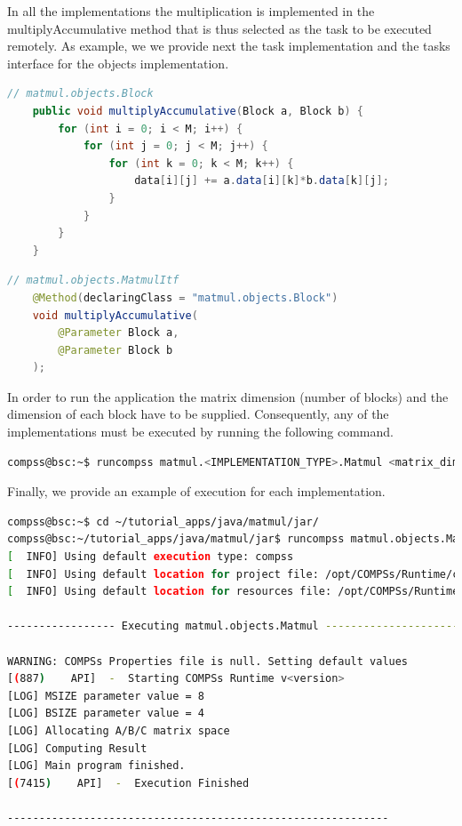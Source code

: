 \newpage 
In all the implementations the multiplication is implemented in the multiplyAccumulative method that is thus selected as the task to be executed remotely.
As example, we we provide next the task implementation and the tasks interface for the objects implementation.

\begin{lstlisting}[language=java]
	// matmul.objects.Block
	public void multiplyAccumulative(Block a, Block b) {
		for (int i = 0; i < M; i++) {
			for (int j = 0; j < M; j++) {
				for (int k = 0; k < M; k++) {
					data[i][j] += a.data[i][k]*b.data[k][j];
				}
			}
		}
	}
\end{lstlisting}

\begin{lstlisting}[language=java]
	// matmul.objects.MatmulItf
	@Method(declaringClass = "matmul.objects.Block")
	void multiplyAccumulative(
		@Parameter Block a,
		@Parameter Block b
	);
\end{lstlisting}

In order to run the application the matrix dimension (number of blocks) and the dimension of each block have to be supplied. Consequently, any of the 
implementations must be executed by running the following command.
\begin{lstlisting}[language=bash]
compss@bsc:~$ runcompss matmul.<IMPLEMENTATION_TYPE>.Matmul <matrix_dim> <block_dim>
\end{lstlisting}

Finally, we provide an example of execution for each implementation.

\begin{lstlisting}[language=bash]
compss@bsc:~$ cd ~/tutorial_apps/java/matmul/jar/
compss@bsc:~/tutorial_apps/java/matmul/jar$ runcompss matmul.objects.Matmul 8 4
[  INFO] Using default execution type: compss
[  INFO] Using default location for project file: /opt/COMPSs/Runtime/configuration/xml/projects/default_project.xml
[  INFO] Using default location for resources file: /opt/COMPSs/Runtime/configuration/xml/resources/default_resources.xml

----------------- Executing matmul.objects.Matmul --------------------------

WARNING: COMPSs Properties file is null. Setting default values
[(887)    API]  -  Starting COMPSs Runtime v<version>
[LOG] MSIZE parameter value = 8
[LOG] BSIZE parameter value = 4
[LOG] Allocating A/B/C matrix space
[LOG] Computing Result
[LOG] Main program finished.
[(7415)    API]  -  Execution Finished

------------------------------------------------------------
\end{lstlisting}

